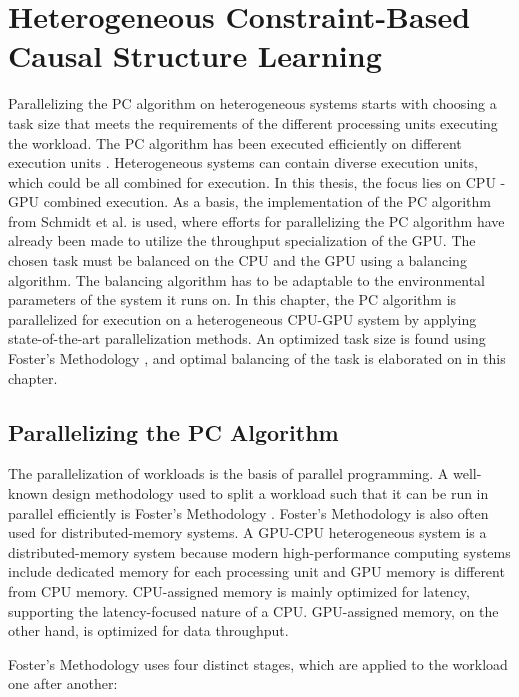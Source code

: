 \chapter{Heterogeneous Constraint-Based Causal Structure Learning}
\label{chap:hetcsl}
Parallelizing the PC algorithm on heterogeneous systems starts with choosing a task size that meets the requirements of the different processing units executing the workload. The PC algorithm has been executed efficiently on different execution units \cite{leParallelPCPackageEfficient2018,leFastPCAlgorithm2019,schmidtOrderIndependentConstraintBasedCausal2018,zarebavaniCuPCCUDAbasedParallel2018}. Heterogeneous systems can contain diverse execution units, which could be all combined for execution. In this thesis, the focus lies on CPU - GPU combined execution. As a basis, the implementation of the PC algorithm from Schmidt et al. \cite{schmidtOrderIndependentConstraintBasedCausal2018} is used, where efforts for parallelizing the PC algorithm have already been made to utilize the throughput specialization of the GPU. The chosen task must be balanced on the CPU and the GPU using a balancing algorithm. The balancing algorithm has to be adaptable to the environmental parameters of the system it runs on. In this chapter, the PC algorithm is parallelized for execution on a heterogeneous CPU-GPU system by applying state-of-the-art parallelization methods. An optimized task size is found using Foster's Methodology \cite{fosterDesigningBuildingParallel1995}, and optimal balancing of the task is elaborated on in this chapter.

\section{Parallelizing the PC Algorithm}
The parallelization of workloads is the basis of parallel programming. A well-known design methodology used to split a workload such that it can be run in parallel efficiently is Foster's Methodology \cite{fosterDesigningBuildingParallel1995}. Foster's Methodology is also often used for distributed-memory systems. A GPU-CPU heterogeneous system is a distributed-memory system because modern high-performance computing systems include dedicated memory for each processing unit and GPU memory is different from CPU memory. CPU-assigned memory is mainly optimized for latency, supporting the latency-focused nature of a CPU. GPU-assigned memory, on the other hand, is optimized for data throughput.

Foster's Methodology uses four distinct stages, which are applied to the workload one after another:

